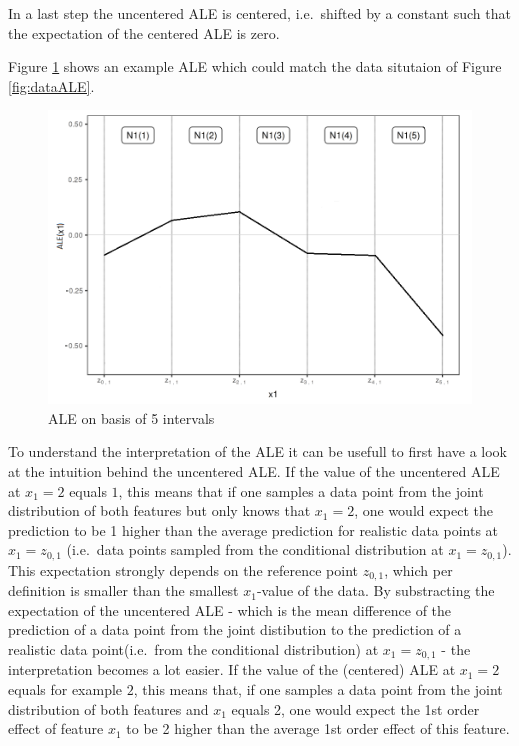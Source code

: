 \documentclass[
]{krantz}
\begin{document}
In a last step the uncentered ALE is centered, i.e.~shifted by a constant such that the expectation of the centered ALE is zero.

Figure \ref{fig:aleEx} shows an example ALE which could match the data situtaion of Figure \ref{fig:dataALE}.

\begin{figure}
\includegraphics[width=1\linewidth]{images/ale_example} \caption{ALE on basis of 5 intervals}\label{fig:aleEx}
\end{figure}



To understand the interpretation of the ALE it can be usefull to first have a look at the intuition behind the uncentered ALE.
If the value of the uncentered ALE at \(x_1 = 2\) equals \(1\), this means that if one samples a data point from the joint distribution of both features but only knows that \(x_1 = 2\), one would expect the prediction to be 1 higher than the average prediction for realistic data points at \(x_1 = z_{0,1}\) (i.e.~data points sampled from the conditional distribution at \(x_1 = z_{0,1}\)). This expectation strongly depends on the reference point \(z_{0,1}\), which per definition is smaller than the smallest \(x_1\)-value of the data.
By substracting the expectation of the uncentered ALE - which is the mean difference of the prediction of a data point from the joint distibution to the prediction of a realistic data point(i.e.~from the conditional distribution) at \(x_1 = z_{0,1}\) - the interpretation becomes a lot easier. If the value of the (centered) ALE at \(x_1 = 2\) equals for example \(2\), this means that, if one samples a data point from the joint distribution of both features and \(x_1\) equals 2, one would expect the 1st order effect of feature \(x_1\) to be 2 higher than the average 1st order effect of this feature.
\end{document}
